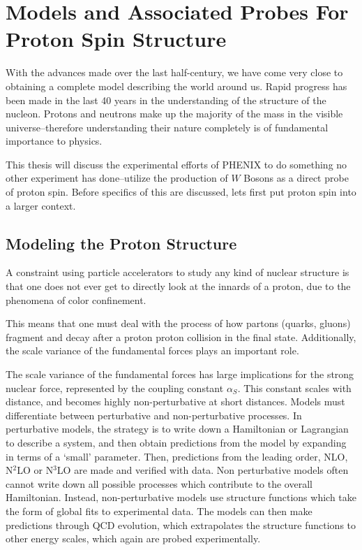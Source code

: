 \chapter{Models and Associated Probes For Proton Spin Structure}
\label{ch:modeling_proton_spin}

With the advances made over the last half-century, we have come very close to
obtaining a complete model describing the world around us.  Rapid progress has
been made in the last 40 years in the understanding of the structure of the
nucleon. Protons and neutrons make up the majority of the mass in the visible
universe--therefore understanding their nature completely is of fundamental
importance to physics.

This thesis will discuss the experimental efforts of PHENIX to do something no
other experiment has done--utilize the production of $W$ Bosons as a direct
probe of proton spin. Before specifics of this are discussed, lets first put
proton spin into a larger context.

\section{Modeling the Proton Structure}

A constraint using particle accelerators to study any kind of nuclear
structure is that one does not ever get to directly look at the innards of a
proton, due to the phenomena of color confinement. 

This means that one must deal with the process of how partons (quarks, gluons)
fragment and decay after a proton proton collision in the final state.
Additionally, the scale variance of the fundamental forces plays an important
role.

The scale variance of the fundamental forces has large implications for the
strong nuclear force, represented by the coupling constant $\alpha_S$. This
constant scales with distance, and becomes highly non-perturbative at short
distances. Models must differentiate between perturbative and non-perturbative
processes. In perturbative models, the strategy is to write down a Hamiltonian
or Lagrangian to describe a system, and then obtain predictions from the model
by expanding in terms of a `small' parameter. Then, predictions from the leading
order, NLO, N$^2$LO or N$^3$LO are made and verified with data. Non perturbative
models often cannot write down all possible processes which contribute to the
overall Hamiltonian. Instead, non-perturbative models use structure functions
which take the form of global fits to experimental data. The models can then
make predictions through QCD evolution, which extrapolates the structure
functions to other energy scales, which again are probed experimentally.

